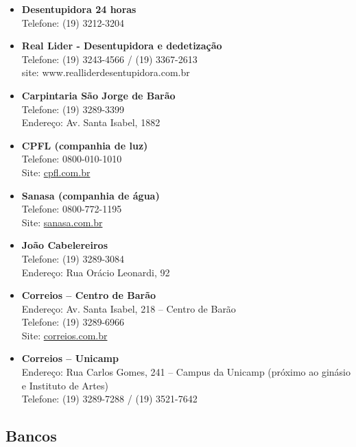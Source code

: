 \begin{itemize}
    \item  \textbf{Desentupidora 24 horas}
        \\Telefone: (19) 3212-3204

    \item  \textbf{Real Lider - Desentupidora e dedetização}
        \\Telefone: (19) 3243-4566 / (19) 3367-2613
        \\site: www.realliderdesentupidora.com.br

    \item  \textbf{Carpintaria São Jorge de Barão}
        \\Telefone: (19) 3289-3399
        \\Endereço: Av. Santa Isabel, 1882

    \item  \textbf{CPFL (companhia de luz)}
        \\Telefone: 0800-010-1010
        \\Site: \url{cpfl.com.br}

    \item  \textbf{Sanasa (companhia de água)}
        \\Telefone: 0800-772-1195
        \\Site: \url{sanasa.com.br}

    \item  \textbf{João Cabelereiros}
        \\Telefone: (19) 3289-3084
        \\Endereço: Rua Orácio Leonardi, 92

    \item  \textbf{Correios -- Centro de Barão}
        \\Endereço: Av. Santa Isabel, 218 -- Centro de Barão
        \\Telefone: (19) 3289-6966
        \\Site: \url{correios.com.br}

    \item  \textbf{Correios -- Unicamp}
        \\Endereço: Rua Carlos Gomes, 241 -- Campus da Unicamp (próximo ao
        ginásio e Instituto de Artes)
        \\Telefone: (19) 3289-7288 / (19) 3521-7642
\end{itemize}

\subsection{Bancos}

